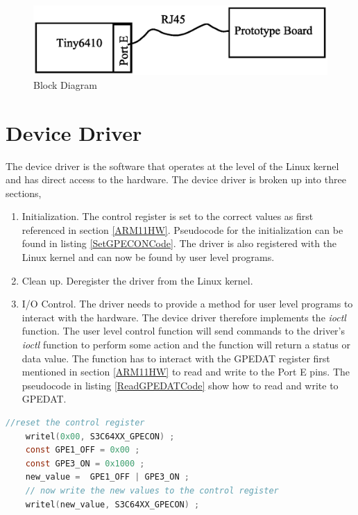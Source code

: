 \documentclass[12pt,conference]{IEEEtran}
\begin{document}
\begin{figure}[h]
	\includegraphics[scale=.50]{BlockDiagram}
	\caption{Block Diagram}\label{BlockDiagram}
\end{figure}


\section{Device Driver}\label{DeviceDriver}
The device driver is the software that operates at the level of the Linux kernel and has direct access to the hardware. The device driver is broken up into three sections,
\begin{enumerate}
	\item Initialization. The control register is set to the correct values as first referenced in section \ref{ARM11HW}. Pseudocode for the initialization can be found in listing \ref{SetGPECONCode}. The driver is also registered with the Linux kernel and can now be found by user level programs.
	\item Clean up. Deregister the driver from the Linux kernel.
	\item I/O Control. The driver needs to provide a method for user level programs to interact with the hardware. The device driver therefore implements the \emph{ioctl} function. The user level control function will send commands to the driver's \emph{ioctl} function to perform some action and the function will return a status or data value. The function has to interact with the GPEDAT register first mentioned in section \ref{ARM11HW} to read and write to the Port E pins.  The pseudocode in listing \ref{ReadGPEDATCode} show how to read and write to GPEDAT.
\end{enumerate}

\begin{lstlisting}[language=C, frame=single, caption=Pseudo Code to Prepare GPECON,label=SetGPECONCode]
	//reset the control register
	writel(0x00, S3C64XX_GPECON) ;
	const GPE1_OFF = 0x00 ;
	const GPE3_ON = 0x1000 ;
	new_value =  GPE1_OFF | GPE3_ON ;
	// now write the new values to the control register
	writel(new_value, S3C64XX_GPECON) ;
\end{lstlisting}
\end{document}
